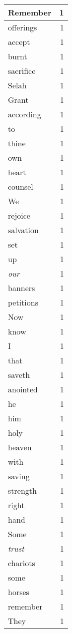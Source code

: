 \begin{center}
\begin{longtable}{l|r}
Remember & 1\\ \hline 
offerings & 1\\ \hline 
accept & 1\\ \hline 
burnt & 1\\ \hline 
sacrifice & 1\\ \hline 
Selah & 1\\ \hline 
Grant & 1\\ \hline 
according & 1\\ \hline 
to & 1\\ \hline 
thine & 1\\ \hline 
own & 1\\ \hline 
heart & 1\\ \hline 
counsel & 1\\ \hline 
We & 1\\ \hline 
rejoice & 1\\ \hline 
salvation & 1\\ \hline 
set & 1\\ \hline 
up & 1\\ \hline 
\emph{our} & 1\\ \hline 
banners & 1\\ \hline 
petitions & 1\\ \hline 
Now & 1\\ \hline 
know & 1\\ \hline 
I & 1\\ \hline 
that & 1\\ \hline 
saveth & 1\\ \hline 
anointed & 1\\ \hline 
he & 1\\ \hline 
him & 1\\ \hline 
holy & 1\\ \hline 
heaven & 1\\ \hline 
with & 1\\ \hline 
saving & 1\\ \hline 
strength & 1\\ \hline 
right & 1\\ \hline 
hand & 1\\ \hline 
Some & 1\\ \hline 
\emph{trust} & 1\\ \hline 
chariots & 1\\ \hline 
some & 1\\ \hline 
horses & 1\\ \hline 
remember & 1\\ \hline 
They & 1\\ \hline 

\end{longtable}
\end{center}
